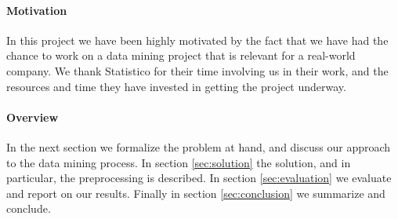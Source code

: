 \paragraph{Motivation}
In this project we have been highly motivated by the fact that we have had the chance to work on a data mining project that is relevant for a real-world company. We thank Statistico for their time involving us in their work, and the resources and time they have invested in getting the project underway.

\paragraph{Overview}
In the next section we formalize the problem at hand, and discuss our approach to the data mining process. In section \ref{sec:solution} the solution, and in particular, the preprocessing is described. In section \ref{sec:evaluation} we evaluate and report on our results. Finally in section \ref{sec:conclusion} we summarize and conclude.